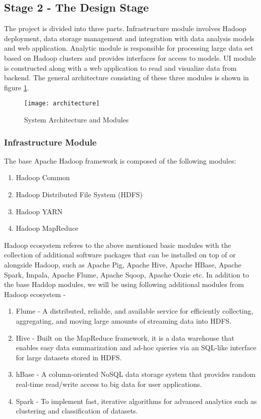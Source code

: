 \subsection{Stage 2 - The Design Stage}
\label{sec:stage2}

The project is divided into three parts. Infrastructure module involves Hadoop deployment, data storage management and integration with data analysis models and web application. Analytic module is responsible for processing large data set based on Hadoop clusters and provides interfaces for access to models. UI module is constructed  along with a web application to read and visualize data from backend. The general architecture consisting of these three modules is shown in figure \ref{fig:arch}.

\begin{figure}[!ht]
\centering
\texttt{[image: architecture]}
\caption{System Architecture and Modules}
\label{fig:arch}
\end{figure}

\subsubsection{Infrastructure Module}

The base Apache Hadoop framework is composed of the following modules:
\begin{enumerate}
\item Hadoop Common
\item Hadoop Distributed File System (HDFS)
\item Hadoop YARN
\item Hadoop MapReduce
\end{enumerate}

Hadoop ecosystem referes to the above mentioned basic modules with the  collection of additional software packages that can be installed on top of or alongside Hadoop, such as Apache Pig, Apache Hive, Apache HBase, Apache Spark, Impala, Apache Flume, Apache Sqoop, Apache Oozie etc.
In addition to the base Haddop modules, we will be using following additional modules from Hadoop ecosystem -

\begin{enumerate}
\item Flume - A distributed, reliable, and available service for efficiently collecting, aggregating, and moving large amounts of streaming data into HDFS. 
\item Hive - Built on the MapReduce framework, it is a data warehouse that enables easy data summarization and ad-hoc queries via an SQL-like interface for large datasets stored in HDFS.
\item hBase - A column-oriented NoSQL data storage system that provides random real-time read/write access to big data for user applications.
\item Spark - To implement fast, iterative algorithms for advanced analytics such as clustering and classification of datasets.
\end{enumerate}


